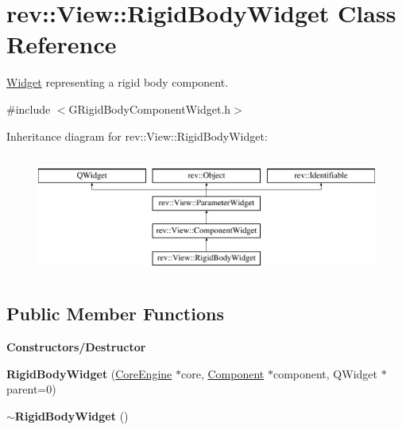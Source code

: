 \hypertarget{classrev_1_1_view_1_1_rigid_body_widget}{}\section{rev\+::View\+::Rigid\+Body\+Widget Class Reference}
\label{classrev_1_1_view_1_1_rigid_body_widget}


\mbox{\hyperlink{class_widget}{Widget}} representing a rigid body component.  




{\ttfamily \#include $<$G\+Rigid\+Body\+Component\+Widget.\+h$>$}

Inheritance diagram for rev\+::View\+::Rigid\+Body\+Widget\+:\begin{figure}[H]
\begin{center}
\leavevmode
\includegraphics[height=4.000000cm]{classrev_1_1_view_1_1_rigid_body_widget}
\end{center}
\end{figure}
\subsection*{Public Member Functions}
\begin{Indent}\textbf{ Constructors/\+Destructor}\par
\begin{DoxyCompactItemize}
\item 
\mbox{\label{classrev_1_1_view_1_1_rigid_body_widget_a0a01c78c34ac6d2652913eae344827c9}} 
{\bfseries Rigid\+Body\+Widget} (\mbox{\hyperlink{classrev_1_1_core_engine}{Core\+Engine}} $\ast$core, \mbox{\hyperlink{classrev_1_1_component}{Component}} $\ast$component, Q\+Widget $\ast$parent=0)
\item 
\mbox{\label{classrev_1_1_view_1_1_rigid_body_widget_aae358afcb62919aa1733cd693f58ddc6}} 
{\bfseries $\sim$\+Rigid\+Body\+Widget} ()
\end{DoxyCompactItemize}
\end{Indent}
